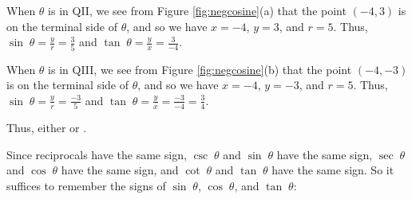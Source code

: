\begin{exmp}
\par\noindent When $\theta$ is in QII, we see from Figure \ref{fig:negcosine}(a) that the point
$(-4,3)$ is on the terminal side of $\theta$, and so we have $x = -4$, $y = 3$, and $r = 5$. Thus,
$\sin\;\theta = \frac{y}{r} = \frac{3}{5}$ and $\tan\;\theta = \frac{y}{x} = \frac{3}{-4}$.

\par\noindent When $\theta$ is in QIII, we see from Figure \ref{fig:negcosine}(b) that the point
$(-4,-3)$ is on the terminal side of $\theta$, and so we have $x = -4$, $y = -3$, and $r = 5$. Thus,
$\sin\;\theta = \frac{y}{r} = \frac{-3}{5}$ and $\tan\;\theta = \frac{y}{x} = \frac{-3}{-4} =
\frac{3}{4}$.

\par\noindent Thus, either  or
.
\end{exmp}
\divider
\vspace{2mm}

Since reciprocals have the same sign, $\csc\;\theta$ and $\sin\;\theta$ have the same sign,
$\sec\;\theta$ and $\cos\;\theta$ have the same sign, and
$\cot\;\theta$ and $\tan\;\theta$ have the same sign. So it suffices to remember the signs of
$\sin\;\theta$, $\cos\;\theta$, and $\tan\;\theta$:\vspace{2mm}

\begin{center}\end{center}\vspace{-4mm}

\divider
\vspace{2mm}

